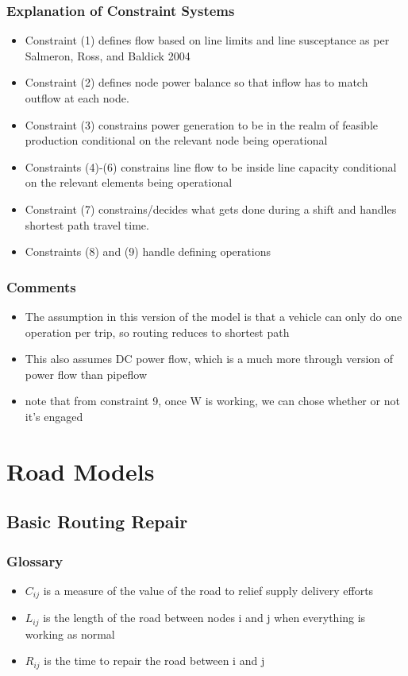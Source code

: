 \documentclass{article}
\begin{document}
	\subsubsection{Explanation of Constraint Systems}
	\begin{itemize}
		\item Constraint (1) defines flow based on line limits and line susceptance as per Salmeron, Ross, and Baldick 2004
		\item Constraint (2) defines node power balance so that inflow has to match outflow at each node.
		\item Constraint (3) constrains power generation to be in the realm of feasible production conditional on the relevant node being operational
		\item Constraints (4)-(6) constrains line flow to be inside line capacity conditional on the relevant elements being operational
		\item Constraint (7) constrains/decides what gets done during a shift and handles shortest path travel time.
		\item Constraints (8) and (9) handle defining operations
	\end{itemize}
	\subsubsection{Comments}
	\begin{itemize}
		\item The assumption in this version of the model is that a vehicle can only do one operation per trip, so routing reduces to shortest path
		\item This also assumes DC power flow, which is a much more through version of power flow than pipeflow
		\item note that from constraint 9, once W is working, we can chose whether or not it's engaged
	\end{itemize}
\section{Road Models}
\subsection{Basic Routing Repair}
		\subsubsection{Glossary}
	\begin{itemize}
		\item $C_{ij}$ is a measure of the value of the road to relief supply delivery efforts
		\item $L_{ij}$ is the length of the road between nodes i and j when everything is working as normal
		\item $R_{ij}$ is the time to repair the road between i and j
	\end{itemize}
\end{document}
